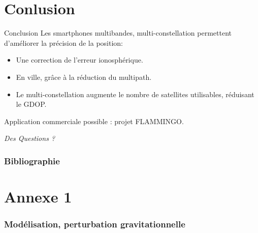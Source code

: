 \documentclass[xcolor=dvipsnames,envcountsect]{beamer}
\makeatletter
\let\beamer@writeslidentry@miniframeson=\beamer@writeslidentry
\def\beamer@writeslidentry@miniframesoff{%
  \expandafter\beamer@ifempty\expandafter{\beamer@framestartpage}{}%
  {%
    \clearpage\beamer@notesactions%
  }
}
\newcommand*{\miniframeson}{\let\beamer@writeslidentry=\beamer@writeslidentry@miniframeson}
\newcommand*{\miniframesoff}{\let\beamer@writeslidentry=\beamer@writeslidentry@miniframesoff}
\makeatother
\begin{document}
\section{Conlusion}
\begin{frame}{Conclusion}
	Les smartphones multibandes, multi-constellation permettent d'améliorer la précision de la position:
	\begin{itemize}
		\item Une correction de l'erreur ionosphérique.
		\item En ville, grâce à la réduction du multipath.
		\item Le multi-constellation augmente le nombre de satellites utilisables, réduisant le GDOP.
	\end{itemize}
	Application commerciale possible : projet FLAMMINGO.
\end{frame}

\miniframesoff
\begin{frame}
	\centering
	\begin{block}
		\scshape
			\begin{center}
				\Huge\emph{Des Questions ?}
			\end{center}
	\end{block}
\end{frame}

\miniframeson
\appendix
\begin{frame}[allowframebreaks]
	\frametitle{Bibliographie}
	\printbibliography
\end{frame}

\section{Annexe 1}
\begin{frame}
	\label{appendix:1}
	\frametitle{Modélisation, perturbation gravitationnelle}
	
\end{frame}
\end{document}
